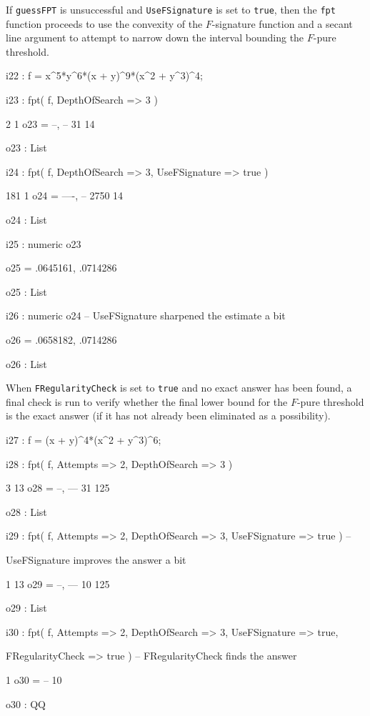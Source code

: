 \documentclass{amsart}
\begin{document}
If {\tt guessFPT} is unsuccessful and {\tt UseFSignature} is set to {\tt true}, then the {\tt fpt} function proceeds to use the convexity of the $F$-signature function and a secant line argument to attempt to narrow down the interval bounding the $F$-pure threshold.

{\small
{}
\begin{MyVerbatim}

i22 : f = x^5*y^6*(x + y)^9*(x^2 + y^3)^4;

i23 : fpt( f, DepthOfSearch => 3 )

        2   1
o23 = {--, --}
       31  14

o23 : List

i24 : fpt( f, DepthOfSearch => 3, UseFSignature => true )

        181   1
o24 = {----, --}
       2750  14

o24 : List

i25 : numeric o23

o25 = {.0645161, .0714286}

o25 : List

i26 : numeric o24 -- UseFSignature sharpened the estimate a bit

o26 = {.0658182, .0714286}

o26 : List

\end{MyVerbatim}
}

When {\tt FRegularityCheck} is set to {\tt true} and no exact answer has been found, a final check is run to verify whether the final lower bound for the $F$-pure threshold is the exact answer (if it has not already been eliminated as a possibility).

{\small
{}
\begin{MyVerbatim}

i27 : f = (x + y)^4*(x^2 + y^3)^6;

i28 : fpt( f, Attempts => 2, DepthOfSearch => 3 )

        3   13
o28 = {--, ---}
       31  125

o28 : List

i29 : fpt( f, Attempts => 2, DepthOfSearch => 3, UseFSignature => true ) --

      UseFSignature improves the answer a bit

        1   13
o29 = {--, ---}
       10  125

o29 : List

i30 : fpt( f, Attempts => 2, DepthOfSearch => 3, UseFSignature => true,

      FRegularityCheck => true ) -- FRegularityCheck finds the answer

       1
o30 = --
      10

o30 : QQ

\end{MyVerbatim}
}
\end{document}
